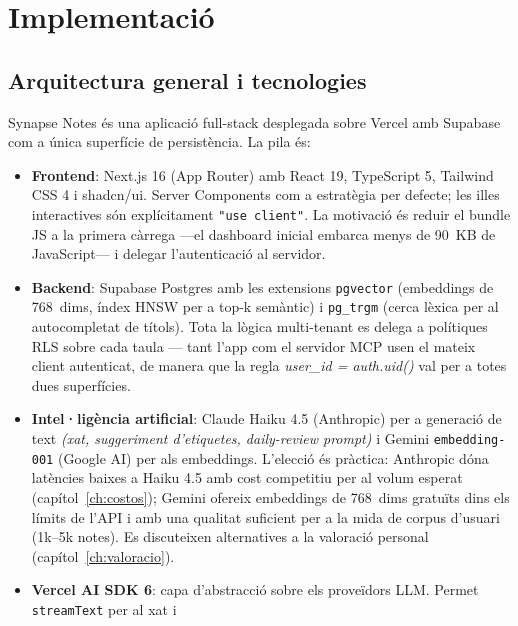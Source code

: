 \chapter{Implementació}
\label{ch:implementacio}

\section{Arquitectura general i tecnologies}
\label{sec:arquitectura-general}

Synapse Notes és una aplicació full-stack desplegada sobre Vercel
amb Supabase com a única superfície de persistència. La pila és:

\begin{itemize}
    \item \textbf{Frontend}: Next.js 16 (App Router) amb React 19,
        TypeScript 5, Tailwind CSS 4 i shadcn/ui. Server Components
        com a estratègia per defecte; les illes interactives són
        explícitament \texttt{"use client"}. La motivació és reduir
        el bundle JS a la primera càrrega ---el dashboard inicial
        embarca menys de 90~KB de JavaScript--- i delegar
        l'autenticació al servidor.
    \item \textbf{Backend}: Supabase Postgres amb les extensions
        \texttt{pgvector} (embeddings de 768~dims, índex HNSW per a
        top-k semàntic) i \texttt{pg\_trgm} (cerca lèxica per al
        autocompletat de títols). Tota la lògica multi-tenant es
        delega a polítiques RLS sobre cada taula --- tant l'app
        com el servidor MCP usen el mateix client autenticat, de
        manera que la regla \emph{user\_id = auth.uid()} val per
        a totes dues superfícies.
    \item \textbf{Intel·ligència artificial}: Claude Haiku 4.5
        (Anthropic) per a generació de text \emph{(xat, suggeriment
        d'etiquetes, daily-review prompt)} i Gemini
        \texttt{embedding-001} (Google AI) per als embeddings.
        L'elecció és pràctica: Anthropic dóna latències baixes a
        Haiku 4.5 amb cost competitiu per al volum esperat
        (capítol~\ref{ch:costos}); Gemini ofereix embeddings
        de 768~dims gratuïts dins els límits de l'API i amb una
        qualitat suficient per a la mida de corpus d'usuari (1k--5k
        notes). Es discuteixen alternatives a la valoració personal
        (capítol~\ref{ch:valoracio}).
    \item \textbf{Vercel AI SDK 6}: capa d'abstracció sobre els
        proveïdors LLM. Permet \texttt{streamText} per al xat i

\end{itemize}
